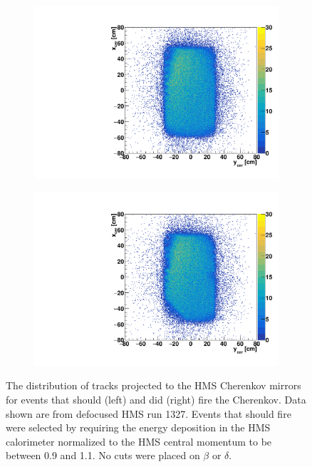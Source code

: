 \begin{figure}[h]
    \centering
    \begin{subfigure}[b]{0.45\textwidth}
        \centering
        \includegraphics[width=\textwidth]{chap4/plot_scripts/hCer_should.pdf}
        \label{fig:hms_mirror_should}
    \end{subfigure}
    \begin{subfigure}[b]{0.45\textwidth}
        \centering
        \includegraphics[width=\textwidth]{chap4/plot_scripts/hCer_did.pdf}
        \label{fig:hms_mirror_did}
    \end{subfigure}
    \caption[
            The distribution of tracks projected to the HMS Cherenkov mirrors
            for events that should (left) and did (right) fire the Cherenkov.]{
            The distribution of tracks projected to the HMS Cherenkov mirrors
            for events that should (left) and did (right) fire the Cherenkov.
            Data shown are from defocused HMS run 1327.
            Events that should fire were selected by requiring the energy
            deposition in the HMS calorimeter normalized to the HMS central
            momentum to be between 0.9 and 1.1.
            No cuts were placed on $\beta$ or $\delta$.
            }
    \label{fig:hms_mirror_defocused_tracks}
\end{figure}

